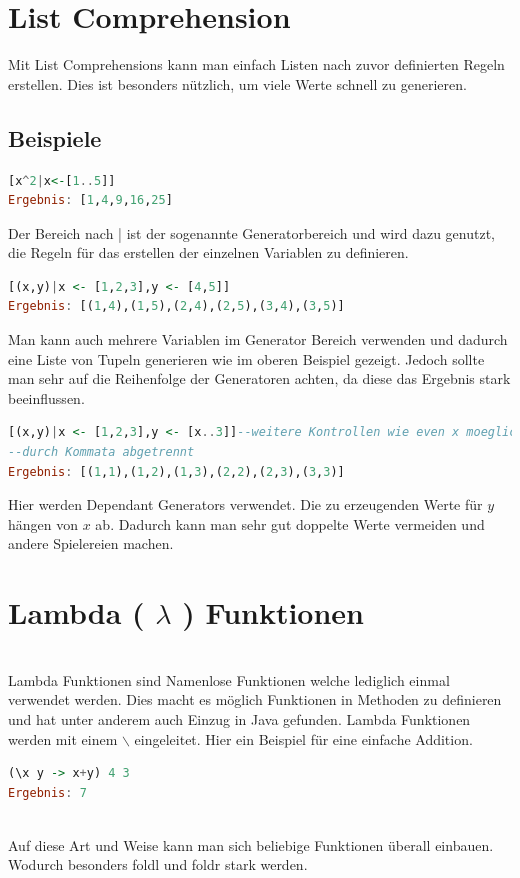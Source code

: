 \section{List Comprehension}
Mit List Comprehensions kann man einfach Listen nach zuvor definierten Regeln erstellen. Dies ist besonders nützlich, um viele Werte schnell zu generieren.
\subsection{Beispiele}
\begin{lstlisting}[language=Haskell]
[x^2|x<-[1..5]]
Ergebnis: [1,4,9,16,25] 
\end{lstlisting}
Der Bereich nach | ist der sogenannte Generatorbereich und wird dazu genutzt, die Regeln für das erstellen der einzelnen Variablen zu definieren. \\ 
\begin{lstlisting}[language=Haskell]
[(x,y)|x <- [1,2,3],y <- [4,5]]
Ergebnis: [(1,4),(1,5),(2,4),(2,5),(3,4),(3,5)] 
\end{lstlisting}
Man kann auch mehrere Variablen im Generator Bereich verwenden und dadurch eine Liste von Tupeln generieren wie im oberen Beispiel gezeigt.  Jedoch sollte man sehr auf die Reihenfolge der Generatoren achten, da diese das Ergebnis stark beeinflussen. \\
\begin{lstlisting}[language=Haskell]
[(x,y)|x <- [1,2,3],y <- [x..3]]--weitere Kontrollen wie even x moeglich 
--durch Kommata abgetrennt
Ergebnis: [(1,1),(1,2),(1,3),(2,2),(2,3),(3,3)] 
\end{lstlisting}
Hier werden Dependant Generators verwendet. Die zu erzeugenden Werte für $y$ hängen von $x$ ab. Dadurch kann man sehr gut doppelte Werte vermeiden und andere Spielereien machen. \\

\section{Lambda ( $\lambda$ ) Funktionen}\qquad\\
Lambda Funktionen sind Namenlose Funktionen welche lediglich einmal verwendet werden. Dies macht es möglich Funktionen in Methoden zu definieren und hat unter anderem auch Einzug in Java gefunden. Lambda Funktionen werden mit einem $\backslash$ eingeleitet. Hier ein Beispiel für eine einfache Addition.\\
\begin{lstlisting}[language=Haskell]
(\x y -> x+y) 4 3
Ergebnis: 7
\end{lstlisting}\qquad\\
Auf diese Art und Weise kann man sich beliebige Funktionen überall einbauen. Wodurch besonders foldl und foldr stark werden. 
